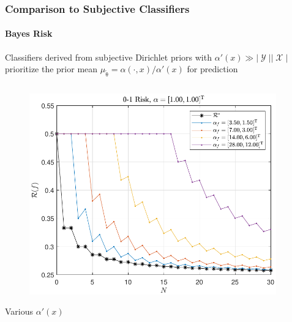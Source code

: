 \documentclass[aspectratio=169]{beamer}
\DeclareMathOperator{\Xcal}{\mathcal{X}}
\DeclareMathOperator{\Ycal}{\mathcal{Y}}
\begin{document}
\begin{frame}
\frametitle{Comparison to Subjective Classifiers}
\framesubtitle{Bayes Risk}

Classifiers derived from subjective Dirichlet priors with $\alpha'(x) \gg |\Ycal||\Xcal|$ prioritize the prior mean $\mu_{\tilde{\uptheta}} = \alpha(\cdot,x) / \alpha'(x)$ for prediction

\vspace{-0.5em}
\begin{columns}[c]

\begin{column}{.5\linewidth}

\begin{figure}
\centering
\includegraphics[width=1\linewidth]{Risk_01_Dir_N_leg_f_a0.pdf}
\label{fig:Risk_01_Dir_N_leg_f_a0}
\end{figure}
\vspace{-2.5em}
\centering
\footnotesize
Various $\alpha'(x)$

\end{column}

\begin{column}{.5\linewidth}


\end{column}
\end{columns}
\end{frame}
\end{document}
